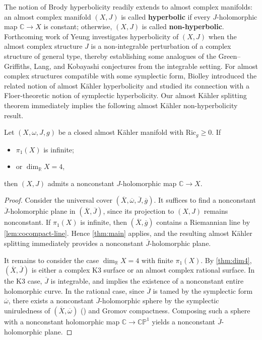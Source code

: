 \documentclass[11pt,twoside]{amsart}
\begin{document}
The notion of Brody hyperbolicity readily extends to almost complex
manifolds: an almost complex manifold $(X,J)$ is called
{\bf hyperbolic} if every $J$-holomorphic map
\(\mathbb C\to X\)
is constant; otherwise, $(X,J)$ is called {\bf non-hyperbolic}. 
Forthcoming work of Yeung \cite{Yeung26} investigates hyperbolicity of $(X,J)$ when the almost complex structure $J$ is a non-integrable perturbation of a complex structure of general type, thereby establishing some analogues of the Green--Griffiths, Lang, and Kobayashi conjectures from the integrable setting. 
For almost complex structures compatible with some symplectic form, 
 Biolley \cite{biolley2004floer} introduced the related notion of almost K\"ahler hyperbolicity and studied its connection with a Floer-theoretic notion of symplectic hyperbolicity. Our almost K\"ahler splitting theorem immediately implies the following almost K\"ahler non-hyperbolicity result.

 \begin{corollary}\label{cor:AKnonhyperbolic}
     Let $(X,\omega,J,g)$ be a closed almost K\"ahler manifold with $\text{Ric}_g\geq 0$. If
     \begin{itemize}[nosep]
         \item $\pi_1(X)$ is infinite;
         \item or $\dim_{\mathbb{R}} X=4$,
     \end{itemize}
     then $(X,J)$ admits a nonconstant $J$-holomorphic map $\mathbb{C}\to X$. 
 \end{corollary}
 \begin{proof}
     Consider the universal cover $(\overline{X},\overline{\omega},\overline{J},\overline{g})$. It suffices to find a nonconstant $\overline J$-holomorphic plane in $(\overline X,\overline J)$, since its projection to $(X,J)$ remains nonconstant. If $\pi_1(X)$ is infinite, then $(\overline X,\overline g)$ contains a Riemannian line by \autoref{lem:cocompact-line}. Hence \autoref{thm:main} applies, and the resulting almost K\"ahler splitting immediately provides a nonconstant $\overline J$-holomorphic plane.

It remains to consider the case $\dim_{\mathbb R}X=4$ with finite $\pi_1(X)$. By \autoref{thm:dim4},
$(\overline X,\overline J)$ is either a complex K3 surface or an almost
complex rational surface. In the K3 case, $\overline J$ is integrable,
and \cite[Corollary 2.2]{KLV14} implies the existence of a nonconstant
entire holomorphic curve. In the rational case, since $\overline J$ is
tamed by the symplectic form $\overline\omega$, there exists a
nonconstant $\overline J$-holomorphic sphere by the symplectic uniruledness of $(\overline{X},\overline{\omega})$ (\cite[Theorem 7.3]{Wendlbook}) and Gromov compactness. Composing such a sphere
with a nonconstant holomorphic map $\mathbb C\to\mathbb{CP}^1$ yields a
nonconstant $\overline J$-holomorphic plane.
 \end{proof}
 
\end{document}
